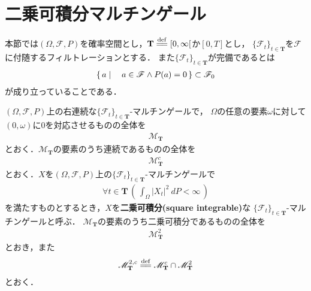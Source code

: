 \section{二乗可積分マルチンゲール}
	本節では$(\Omega,\mathscr{F},P)$を確率空間とし，$\mathbf{T} \defeq [0,\infty[$か$[0,T]$とし，
	$\{\mathscr{F}_t\}_{t \in \mathbf{T}}$を$\mathscr{F}$に付随するフィルトレーションとする．
	また$\{\mathscr{F}_t\}_{t \in \mathbf{T}}$が完備であるとは
	\begin{align}
		\left\{\, a \mid \quad a \in \mathscr{F} \wedge P(a) = 0\, \right\} \subset \mathscr{F}_0
	\end{align}
	が成り立っていることである．
	
	\begin{screen}
		\begin{dfn}[二乗可積分マルチンゲール]
			$(\Omega,\mathscr{F},P)$上の右連続な$\{\mathscr{F}_t\}_{t \in \mathbf{T}}$-マルチンゲールで，
			$\Omega$の任意の要素$\omega$に対して$(0,\omega)$に$0$を対応させるものの全体を
			\begin{align}
				\mathscr{M}_{\mathbf{T}}
			\end{align}
			とおく．$\mathscr{M}_{\mathbf{T}}$の要素のうち連続であるものの全体を
			\begin{align}
				\mathscr{M}^c_{\mathbf{T}}
			\end{align}
			とおく．$X$を$(\Omega,\mathscr{F},P)$上の$\{\mathscr{F}_t\}_{t \in \mathbf{T}}$-マルチンゲールで
			\begin{align}
				\forall t \in \mathbf{T}\, \left(\, \int_\Omega |X_t|^2\ dP < \infty\, \right)
			\end{align}
			を満たすものとするとき，$X$を{\bf 二乗可積分}{\bf (square integrable)}な
			$\{\mathscr{F}_t\}_{t \in \mathbf{T}}$-マルチンゲールと呼ぶ．
			$\mathscr{M}_{\mathbf{T}}$の要素のうち二乗可積分であるものの全体を
			\begin{align}
				\mathscr{M}^2_{\mathbf{T}}
			\end{align}
			とおき，また
			\begin{align}
				\mathscr{M}^{2,c}_{\mathbf{T}} \defeq \mathscr{M}^c_{\mathbf{T}} \cap \mathscr{M}^2_{\mathbf{T}}
			\end{align}
			とおく．
		\end{dfn}
	\end{screen}
	
	\begin{screen}
		\begin{thm}[Doobの劣マルチンゲール不等式]
		\end{thm}
	\end{screen}
	
